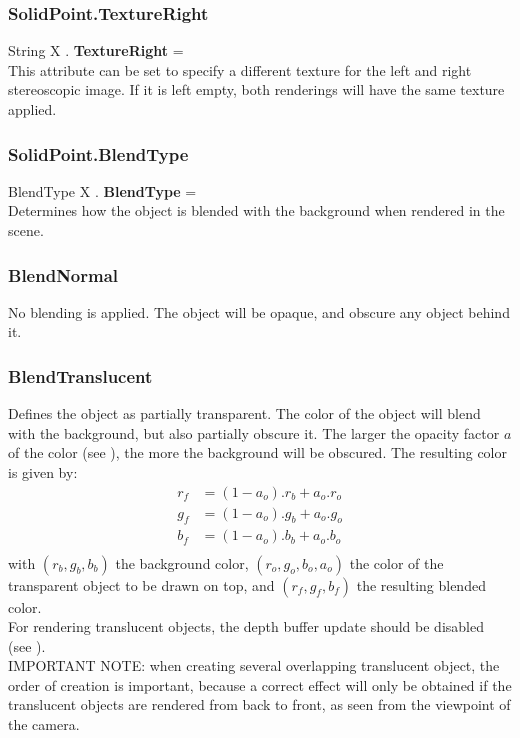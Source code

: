 \subsubsection{SolidPoint.TextureRight \label{F:SolidPoint:TextureRight}}
String X . \textbf{TextureRight} = \\
This attribute can be set to specify a different texture for the left and right stereoscopic image. If it is left empty, both renderings will have the same texture applied.

\subsubsection{SolidPoint.BlendType \label{F:SolidPoint:BlendType}}
BlendType X . \textbf{BlendType} = \\
Determines how the object is blended with the background when rendered in the scene.

\subsubsection{BlendNormal \label{T:BlendType|BlendNormal}}
No blending is applied. The object will be opaque, and obscure any object behind it.

\subsubsection{BlendTranslucent \label{T:BlendType|BlendTranslucent}}
Defines the object as partially transparent. The color of the object will blend with the background, but also partially obscure it. The larger the opacity factor $a$ of the color (see ), the more the background will be obscured. The resulting color is given by:
\begin{equation}
\begin{array}{rcl}
r_f & = (1-a_o) . r_b + a_o . r_o \\
g_f & = (1-a_o) . g_b + a_o . g_o \\
b_f & = (1-a_o) . b_b + a_o . b_o \\
\end{array}
\end{equation}
with $(r_b,g_b,b_b)$ the background color, $(r_o,g_o,b_o,a_o)$ the color of the transparent object to be drawn on top, and $(r_f,g_f,b_f)$ the resulting blended color. \\
For rendering translucent objects, the depth buffer update should be disabled (see ). \\
IMPORTANT NOTE: when creating several overlapping translucent object, the order of creation is important, because a correct effect will only be obtained if the translucent objects are rendered from back to front, as seen from the viewpoint of the camera.

